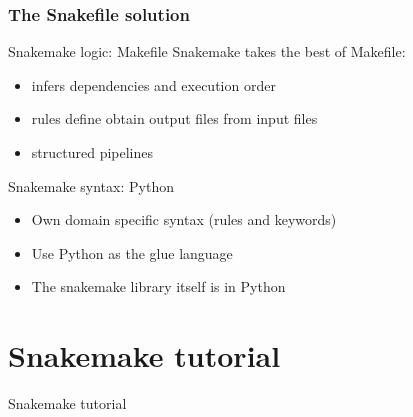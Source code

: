 \documentclass{beamer}
\begin{document}
\begin{frame}
 \frametitle{The Snakefile solution}
 \begin{block}{Snakemake logic: Makefile }
  Snakemake takes the best of Makefile: 
  \begin{itemize}
      \item infers dependencies and execution order
      \item rules define obtain output files from input files
      \item structured pipelines
  \end{itemize}
  \end{block}
  \begin{block}{Snakemake syntax: Python}
  \begin{itemize}
  \item Own domain specific syntax (rules and keywords)
  \item Use Python as the glue language
  \item The snakemake library itself is in Python
  \end{itemize}
  \end{block} 
\end{frame}


\section{Snakemake tutorial}

\begin{frame}[plain]
 \centering
 \begin{Huge}
 Snakemake tutorial
 \end{Huge}
\end{frame}

\end{document}
